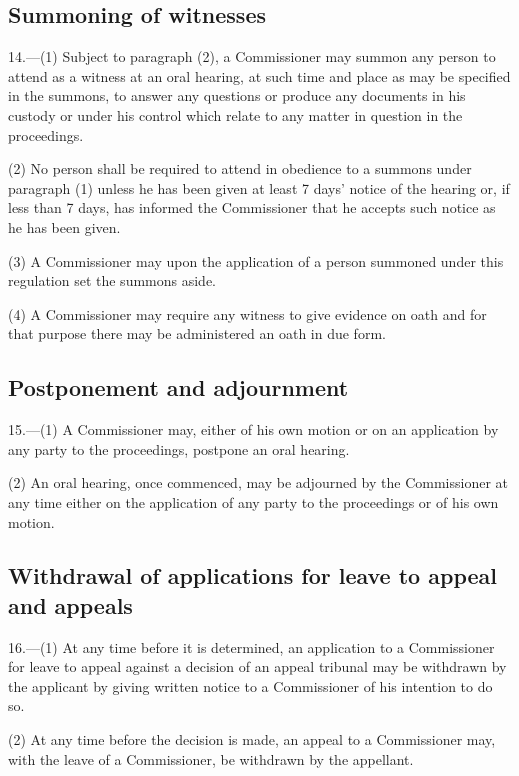 \documentclass[12pt,a4paper]{article}
\begin{document}
\subsection[14. Summoning of witnesses]{Summoning of witnesses}

14.—(1) Subject to paragraph (2), a Commissioner may summon any person to attend as a witness at an oral hearing, at such time and place as may be specified in the summons, to answer any questions or produce any documents in his custody or under his control which relate to any matter in question in the proceedings.

(2) No person shall be required to attend in obedience to a summons under paragraph (1) unless he has been given at least 7 days' notice of the hearing or, if less than 7 days, has informed the Commissioner that he accepts such notice as he has been given.

(3) A Commissioner may upon the application of a person summoned under this regulation set the summons aside.

(4) A Commissioner may require any witness to give evidence on oath and for that purpose there may be administered an oath in due form.

\subsection[15. Postponement and adjournment]{Postponement and adjournment}

15.—(1) A Commissioner may, either of his own motion or on an application by any party to the proceedings, postpone an oral hearing.

(2) An oral hearing, once commenced, may be adjourned by the Commissioner at any time either on the application of any party to the proceedings or of his own motion.

\subsection[16. Withdrawal of applications for leave to appeal and appeals]{Withdrawal of applications for leave to appeal and appeals}

16.—(1) At any time before it is determined, an application to a Commissioner for leave to appeal against a decision of an appeal tribunal may be withdrawn by the applicant by giving written notice to a Commissioner of his intention to do so.

(2) At any time before the decision is made, an appeal to a Commissioner may, with the leave of a Commissioner, be withdrawn by the appellant.
\end{document}
